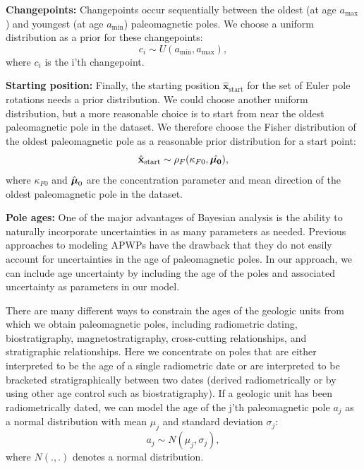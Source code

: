 \documentclass[11pt,letterpaper]{article}
\newcommand{\mitbf}[1]{\hbox{\mathversion{bold}$#1$}}
\begin{document}
\textbf{Changepoints:} 
Changepoints occur sequentially between the oldest (at age $a_\mathrm{max}$) and youngest (at age $a_\mathrm{min}$) paleomagnetic poles. We choose a uniform distribution as a prior for these changepoints:
\begin{equation}
c_i \sim U( a_\mathrm{min}, a_\mathrm{max}),
\end{equation}
where $c_i$ is the i'th changepoint.

\textbf{Starting position:}
Finally, the starting position $\hat{\mathbf{x}}_\mathrm{start}$ for the set of Euler pole rotations needs a prior distribution. We could choose another uniform distribution, but a more reasonable choice is to start from near the oldest paleomagnetic pole in the dataset. We therefore choose the Fisher distribution of the oldest paleomagnetic pole as a reasonable prior distribution for a start point:
\begin{equation}
\hat{\mathbf{x}}_\mathrm{start} \sim \rho_F(\kappa_{F0}, \hat{\mitbf{\mu_0}}),
\end{equation}
where $\kappa_{F0}$ and $\hat{\mitbf{\mu}}_0$ are the concentration parameter and mean direction of the oldest paleomagnetic pole in the dataset.

\textbf{Pole ages:}
One of the major advantages of Bayesian analysis is the ability to naturally incorporate uncertainties in as many parameters as needed. Previous approaches to modeling APWPs have the drawback that they do not easily account for uncertainties in the age of paleomagnetic poles. In our approach, we can include age uncertainty by including the age of the poles and associated uncertainty as parameters in our model.

There are many different ways to constrain the ages of the geologic units from which we obtain paleomagnetic poles, including radiometric dating, biostratigraphy, magnetostratigraphy, cross-cutting relationships, and stratigraphic relationships. Here we concentrate on poles that are either interpreted to be the age of a single radiometric date or are interpreted to be bracketed stratigraphically between two dates (derived radiometrically or by using other age control such as biostratigraphy). If a geologic unit has been radiometrically dated, we can model the age of the j'th paleomagnetic pole $a_j$ as a normal distribution with mean $\mu_j$ and standard deviation $\sigma_j$:
\begin{equation}
a_j \sim N(\mu_j, \sigma_j),
\end{equation}
where $N(.,.)$ denotes a normal distribution.
\end{document}
